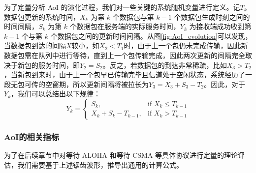 为了定量分析 AoI 的演化过程，我们对一些关键的系统随机变量进行定义。记$T_k$数据包更新的系统时间，$X_k$ 为第 $k$ 个数据包与第 $k-1$ 个数据包生成时刻之间的时间间隔，$S_k$ 为第 $k$ 个数据包在服务端的实际服务时间，$Y_k$ 为接收端成功收到第 $k-1$ 个与第 $k$ 个数据包之间的更新时间间隔。从图\ref{fig:AoI_evolution}可以发现，当数据包到达的间隔$X$较小，如$X_2<T_1$时，由于上一个包仍未完成传输，因此新数据包需在队列中进行等待，直到上一个包传输完成，因此两次更新的间隔完全取决于新包的服务时间，即$Y_2=S_2$。反之，若数据包的到达非常稀疏，比如$X_3>T_2$，当新包到来时，由于上一个包早已传输完毕且信道处于空闲状态，系统经历了一段无包可传的空窗期，所以更新间隔将被拉长为$Y_3=X_3+S_3-T_2$。因此，对于$Y_k$，我们可以总结出以下规律：
\begin{equation}
    Y_{k}=
\begin{cases}
S_{k}, & \text{if } X_{k} \leq T_{k-1} \\
X_{k} + S_{k} - T_{k-1}, & \text{if } X_{k} > T_{k-1}
\end{cases}
\end{equation}

\subsubsection{AoI的相关指标}

为了在后续章节中对等待 ALOHA 和等待 CSMA 等具体协议进行定量的理论评估，我们需要基于上述锯齿波形，推导出通用的计算公式。

